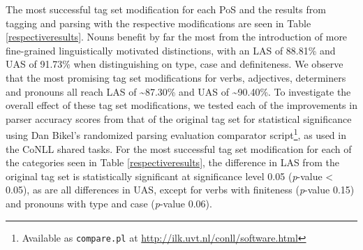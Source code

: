 \documentclass[11pt,a4paper]{article}
\begin{document}
The most successful tag set modification for each PoS and the results from
tagging and parsing with the respective modifications are seen in Table
\ref{respectiveresults}. Nouns benefit by far the most from the introduction of
more fine-grained linguistically motivated distinctions, with an LAS of 88.81\%
and UAS of 91.73\% when distinguishing on type, case and definiteness. We
observe that the most promising tag set modifications for verbs, adjectives,
determiners and pronouns all reach LAS of \textasciitilde 87.30\% and UAS of
\textasciitilde 90.40\%. To investigate the overall effect of these tag set
modifications, we tested each of the improvements in parser accuracy scores
from that of the original tag set for statistical significance using Dan
Bikel's randomized parsing evaluation comparator script\footnote{Available as
    \texttt{compare.pl} at \url{http://ilk.uvt.nl/conll/software.html}}, as
used in the CoNLL shared tasks. For the most successful tag set modification
for each of the categories seen in Table \ref{respectiveresults}, the
difference in LAS from the original tag set is statistically significant at
significance level 0.05 (\emph{p}-value < 0.05), as are all differences in UAS,
except for verbs with finiteness (\emph{p}-value 0.15) and pronouns with type
and case (\emph{p}-value 0.06).
\end{document}
